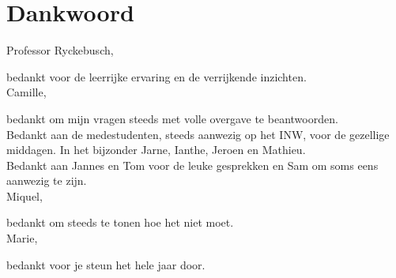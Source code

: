 \documentclass[11pt,twoside]{book}
\begin{document}
\thispagestyle{empty}
\chapter*{Dankwoord}

Professor Ryckebusch,

bedankt voor de leerrijke ervaring en de verrijkende inzichten.
\\

Camille,

bedankt om mijn vragen steeds met volle overgave te beantwoorden.
\\

Bedankt aan de medestudenten, steeds aanwezig op het INW, voor de gezellige middagen. In het bijzonder Jarne, Ianthe, Jeroen en Mathieu.
\\

Bedankt aan Jannes en Tom voor de leuke gesprekken en Sam om soms eens aanwezig te zijn.
\\

Miquel,

bedankt om steeds te tonen hoe het niet moet. \\

Marie,

bedankt voor je steun het hele jaar door.


\newpage

\tableofcontents

\newpage

\end{document}

